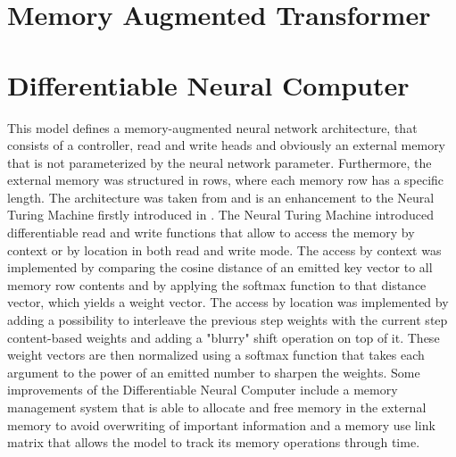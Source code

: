 \documentclass[draft,final]{vutinfth} %
\begin{document}
    \section{Memory Augmented Transformer} \label{mat}

    \section{Differentiable Neural Computer} \label{dnc}
    This model defines a memory-augmented neural network architecture, that consists of a controller, read and write heads and obviously an external memory that is not parameterized by the neural network parameter.
    Furthermore, the external memory was structured in rows, where each memory row has a specific length.
    The architecture was taken from \cite{DNC} and is an enhancement to the Neural Turing Machine firstly introduced in \cite{NTM}.
    The Neural Turing Machine introduced differentiable read and write functions that allow to access the memory by context or by location in both read and write mode.
    The access by context was implemented by comparing the cosine distance of an emitted key vector to all memory row contents and by applying the softmax function to that distance vector, which yields a weight vector.
    The access by location was implemented by adding a possibility to interleave the previous step weights with the current step content-based weights and adding a "blurry" shift operation on top of it.
    These weight vectors are then normalized using a softmax function that takes each argument to the power of an emitted number to sharpen the weights.
    Some improvements of the Differentiable Neural Computer include a memory management system that is able to allocate and free memory in the external memory to avoid overwriting of important information and a memory use link matrix that allows the model to track its memory operations through time.
\end{document}
